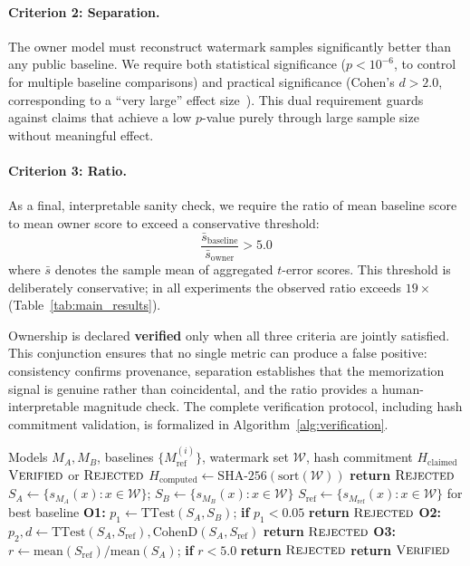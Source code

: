 \documentclass[sigconf, review, anonymous]{acmart}
\begin{document}
\paragraph{Criterion 2: Separation.}
The owner model must reconstruct watermark samples significantly better than any public baseline. We require both statistical significance ($p < 10^{-6}$, to control for multiple baseline comparisons) and practical significance (Cohen's $d > 2.0$, corresponding to a ``very large'' effect size~\citep{cohen1988statistical}). This dual requirement guards against claims that achieve a low $p$-value purely through large sample size without meaningful effect.

\paragraph{Criterion 3: Ratio.}
As a final, interpretable sanity check, we require the ratio of mean baseline score to mean owner score to exceed a conservative threshold:
\begin{equation}
\frac{\bar{s}_{\text{baseline}}}{\bar{s}_{\text{owner}}} > 5.0
\end{equation}
where $\bar{s}$ denotes the sample mean of aggregated $t$-error scores. This threshold is deliberately conservative; in all experiments the observed ratio exceeds $19\times$ (Table~\ref{tab:main_results}).

Ownership is declared \textbf{verified} only when all three criteria are jointly satisfied. This conjunction ensures that no single metric can produce a false positive: consistency confirms provenance, separation establishes that the memorization signal is genuine rather than coincidental, and the ratio provides a human-interpretable magnitude check. The complete verification protocol, including hash commitment validation, is formalized in Algorithm~\ref{alg:verification}.
\begin{algorithm}[t]
\caption{Ownership Verification Protocol}
\label{alg:verification}
\begin{algorithmic}
\REQUIRE Models $M_A, M_B$, baselines $\{M_{\text{ref}}^{(i)}\}$, watermark set $\mathcal{W}$, hash commitment $H_{\text{claimed}}$
\ENSURE $\textsc{Verified}$ or $\textsc{Rejected}$
\STATE $H_{\text{computed}} \leftarrow \text{SHA-256}(\text{sort}(\mathcal{W}))$
    \STATE \textbf{return} $\textsc{Rejected}$
\ENDIF
\STATE $S_A \leftarrow \{s_{M_A}(x) : x \in \mathcal{W}\}$; $S_B \leftarrow \{s_{M_B}(x) : x \in \mathcal{W}\}$
\STATE $S_{\text{ref}} \leftarrow \{s_{M_{\text{ref}}}(x) : x \in \mathcal{W}\}$ for best baseline
\STATE \textbf{O1:} $p_1 \leftarrow \text{TTest}(S_A, S_B)$; \textbf{if} $p_1 < 0.05$ \textbf{return} $\textsc{Rejected}$
\STATE \textbf{O2:} $p_2, d \leftarrow \text{TTest}(S_A, S_{\text{ref}}), \text{CohenD}(S_A, S_{\text{ref}})$
    \STATE \textbf{return} $\textsc{Rejected}$
\ENDIF
\STATE \textbf{O3:} $r \leftarrow \text{mean}(S_{\text{ref}}) / \text{mean}(S_A)$; \textbf{if} $r < 5.0$ \textbf{return} $\textsc{Rejected}$
\STATE \textbf{return} $\textsc{Verified}$
\end{algorithmic}
\end{algorithm}
\end{document}
